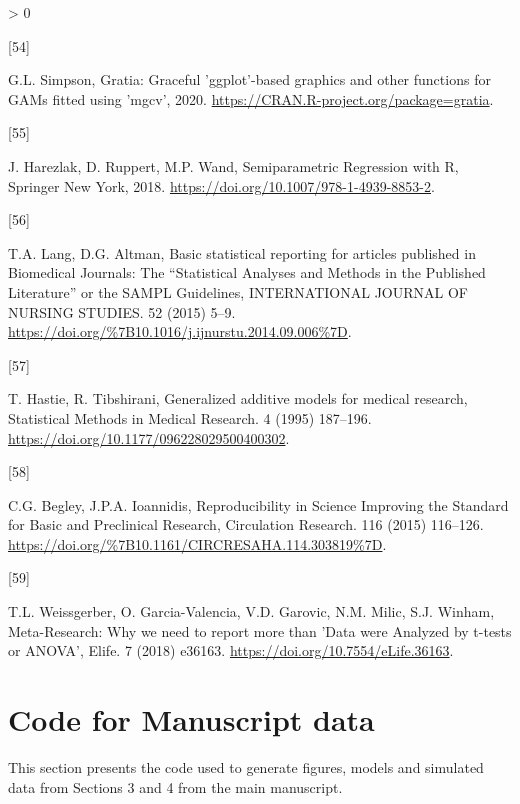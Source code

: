 \documentclass[
]{article}
\newlength{\cslhangindent}
\newlength{\csllabelwidth}
\newenvironment{CSLReferences}[2] %
 {%
  \setlength{\parindent}{0pt}
  \ifodd #1 \everypar{\setlength{\hangindent}{\cslhangindent}}\ignorespaces\fi
  \ifnum #2 > 0
  \setlength{\parskip}{#2\baselineskip}
  \fi
 }%
 {}
\newcommand{\CSLLeftMargin}[1]{\parbox[t]{\csllabelwidth}{#1}}
\newcommand{\CSLRightInline}[1]{\parbox[t]{\linewidth - \csllabelwidth}{#1}\break}
\begin{document}
\begin{CSLReferences}{0}{0}
\leavevmode\hypertarget{ref-gratia}{}%
\CSLLeftMargin{{[}54{]} }
\CSLRightInline{G.L. Simpson, Gratia: Graceful 'ggplot'-based graphics and other functions for GAMs fitted using 'mgcv', 2020. \url{https://CRAN.R-project.org/package=gratia}.}

\leavevmode\hypertarget{ref-harezlak2018}{}%
\CSLLeftMargin{{[}55{]} }
\CSLRightInline{J. Harezlak, D. Ruppert, M.P. Wand, {Semiparametric Regression with R}, Springer New York, 2018. \url{https://doi.org/10.1007/978-1-4939-8853-2}.}

\leavevmode\hypertarget{ref-lang2015}{}%
\CSLLeftMargin{{[}56{]} }
\CSLRightInline{T.A. Lang, D.G. Altman, {Basic statistical reporting for articles published in Biomedical Journals: The ``Statistical Analyses and Methods in the Published Literature{''} or the SAMPL Guidelines}, {INTERNATIONAL JOURNAL OF NURSING STUDIES}. {52} (2015) 5--9. \url{https://doi.org/\%7B10.1016/j.ijnurstu.2014.09.006\%7D}.}

\leavevmode\hypertarget{ref-hastie1995}{}%
\CSLLeftMargin{{[}57{]} }
\CSLRightInline{T. Hastie, R. Tibshirani, Generalized additive models for medical research, {Statistical Methods in Medical Research}. 4 (1995) 187--196. \url{https://doi.org/10.1177/096228029500400302}.}

\leavevmode\hypertarget{ref-begley2015}{}%
\CSLLeftMargin{{[}58{]} }
\CSLRightInline{C.G. Begley, J.P.A. Ioannidis, {Reproducibility in Science Improving the Standard for Basic and Preclinical Research}, {Circulation Research}. {116} (2015) 116--126. \url{https://doi.org/\%7B10.1161/CIRCRESAHA.114.303819\%7D}.}

\leavevmode\hypertarget{ref-weissgerber2018}{}%
\CSLLeftMargin{{[}59{]} }
\CSLRightInline{T.L. Weissgerber, O. Garcia-Valencia, V.D. Garovic, N.M. Milic, S.J. Winham, {Meta-Research: Why we need to report more than 'Data were Analyzed by t-tests or ANOVA'}, Elife. 7 (2018) e36163. \url{https://doi.org/10.7554/eLife.36163}.}

\end{CSLReferences}

\hypertarget{appendix-appendix}{%
\appendix}


\hypertarget{code-for-manuscript-data}{%
\section{Code for Manuscript data}\label{code-for-manuscript-data}}

This section presents the code used to generate figures, models and simulated data from Sections 3 and 4 from the main manuscript.
\end{document}
